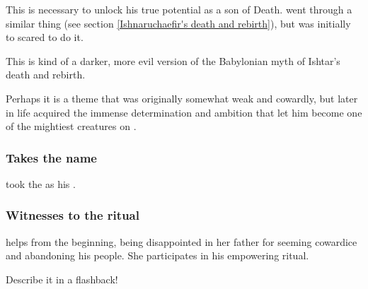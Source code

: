 This is necessary to unlock his true potential as a son of Death. \Ishnaruchaefir{} went through a similar thing (see section \ref{Ishnaruchaefir's death and rebirth}), but \HriistD{} was initially to scared to do it. 

This is kind of a darker, more evil version of the Babylonian myth of Ishtar's death and rebirth. 

Perhaps it is a theme that \Secherdamon{} was originally somewhat weak and cowardly, but later in life acquired the immense determination and ambition that let him become one of the mightiest creatures on \Miith{}. 





\subsubsection{Takes the name \Veldraxx}
\Secherdamon took the \quo{\Veldraxx} as his .





\subsubsection{Witnesses to the ritual}
\Nzessuacrith{} helps \Secherdamon{} from the beginning, being disappointed in her father for seeming cowardice and abandoning his people. She participates in his empowering ritual. 

Describe it in a flashback!


